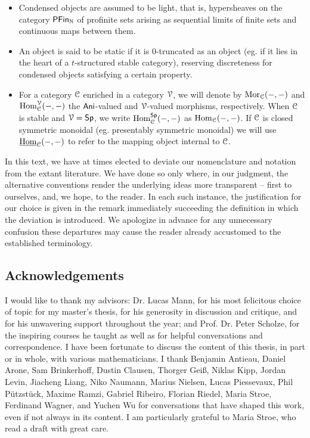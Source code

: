 \begin{itemize}
  \item Condensed objects are assumed to be light, that is, hypersheaves on the category $\mathsf{PFin}_{\mathbb{N}}$ of profinite sets arising as sequential limits of finite sets and continuous maps between them.
  \item An object is said to be static if it is 0-truncated as an object (eg. if it lies in the heart of a $t$-structured stable category), reserving discreteness for condensed objects satisfying a certain property. 
  \item For a category $\EuScript{C}$ enriched in a category $\EuScript{V}$, we will denote by $\mathrm{Mor}_{\EuScript{C}}(-,-)$ and $\mathrm{Hom}_{\EuScript{C}}^{\EuScript{V}}(-,-)$ the $\mathsf{Ani}$-valued and $\EuScript{V}$-valued morphisms, respectively. When $\EuScript{C}$ is stable and $\EuScript{V}=\mathsf{Sp}$, we write $\mathrm{Hom}_{\EuScript{C}}^{\mathsf{Sp}}(-,-)$ as $\mathrm{Hom}_{\EuScript{C}}(-,-)$. If $\EuScript{C}$ is closed symmetric monoidal (eg. presentably symmetric monoidal) we will use $\underline{\mathrm{Hom}}_{\EuScript{C}}(-,-)$ to refer to the mapping object internal to $\EuScript{C}$.
\end{itemize}
In this text, we have at times elected to deviate our nomenclature and notation from the extant literature. We have done so only where, in our judgment, the alternative conventions render the underlying ideas more transparent -- first to ourselves, and, we hope, to the reader. In each such instance, the justification for our choice is given in the remark immediately succeeding the definition in which the deviation is introduced. We apologize in advance for any unnecessary confusion these departures may cause the reader already accustomed to the established terminology.
\subsection{Acknowledgements}\label{subsec: acknowledgements}
I would like to thank my advisors: Dr. Lucas Mann, for his most felicitous choice of topic for my master's thesis, for his generosity in discussion and critique, and for his unwavering support throughout the year; and Prof. Dr. Peter Scholze, for the inspiring courses he taught as well as for helpful conversations and correspondence. I have been fortunate to discuss the content of this thesis, in part or in whole, with various mathematicians. I thank Benjamin Antieau, Daniel Arone, Sam Brinkerhoff, Dustin Clausen, Thorger Gei{\ss}, Niklas Kipp, Jordan Levin, Jiacheng Liang, Niko Naumann, Marius Nielsen, Lucas Piessevaux, Phil P\"{u}tzst\"{u}ck, Maxime Ramzi, Gabriel Ribeiro, Florian Riedel, Maria Stroe, Ferdinand Wagner, and Yuchen Wu for conversations that have shaped this work, even if not always in its content. I am particularly grateful to Maria Stroe, who read a draft with great care.
